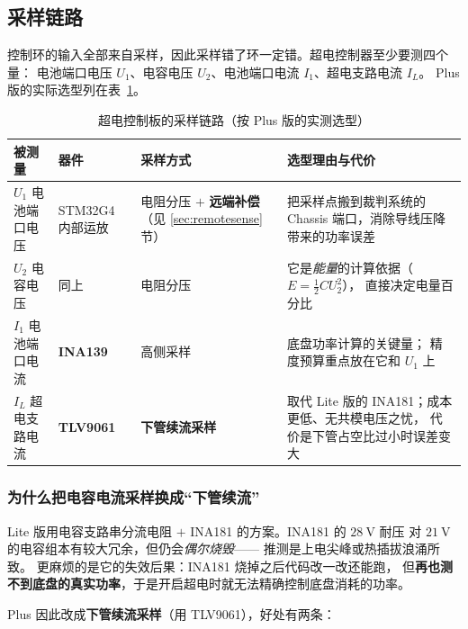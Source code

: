 \documentclass[cn,blue,11pt,device=normal]{elegantnote}
\begin{document}
\subsection{采样链路}

控制环的输入全部来自采样，因此采样错了环一定错。超电控制器至少要测四个量：
电池端口电压 $U_1$、电容电压 $U_2$、电池端口电流 $I_1$、超电支路电流 $I_L$。
Plus 版的实际选型列在表~\ref{tab:sampling}。

\begin{table}[htbp]
  \centering
  \small
  \caption{超电控制板的采样链路（按 Plus 版的实测选型）}
  \label{tab:sampling}
  \begin{tabular}{@{}>{\raggedright\arraybackslash}p{}>{\raggedright\arraybackslash}p{}>{\raggedright\arraybackslash}p{}>{\raggedright\arraybackslash}p{}@{}}
    \toprule
    被测量 & 器件 & 采样方式 & 选型理由与代价 \\
    \midrule
    $U_1$ 电池端口电压 & STM32G4 内部运放 &
    电阻分压 $+$ \textbf{远端补偿}（见 \ref{sec:remotesense} 节） &
    把采样点搬到裁判系统的 Chassis 端口，消除导线压降带来的功率误差 \\[4pt]
    $U_2$ 电容电压 & 同上 &
    电阻分压 & 它是\emph{能量}的计算依据（$E=\frac12CU_2^2$），
    直接决定电量百分比 \\[4pt]
    $I_1$ 电池端口电流 & \textbf{INA139} &
    高侧采样 & 底盘功率计算的关键量；
    精度预算重点放在它和 $U_1$ 上 \\[4pt]
    $I_L$ 超电支路电流 & \textbf{TLV9061} &
    \textbf{下管续流采样} &
    取代 Lite 版的 INA181；成本更低、无共模电压之忧，
    代价是下管占空比过小时误差变大 \\
    \bottomrule
  \end{tabular}
\end{table}

\subsubsection{为什么把电容电流采样换成“下管续流”}

Lite 版用电容支路串分流电阻 $+$ INA181 的方案。INA181 的 $28\ \mathrm{V}$ 耐压
对 $21\ \mathrm{V}$ 的电容组本有较大冗余，但仍会\emph{偶尔烧毁}——
推测是上电尖峰或热插拔浪涌所致。
更麻烦的是它的失效后果：INA181 烧掉之后代码改一改还能跑，
但\textbf{再也测不到底盘的真实功率}，于是开启超电时就无法精确控制底盘消耗的功率。

Plus 因此改成\textbf{下管续流采样}（用 TLV9061），好处有两条：
\end{document}
